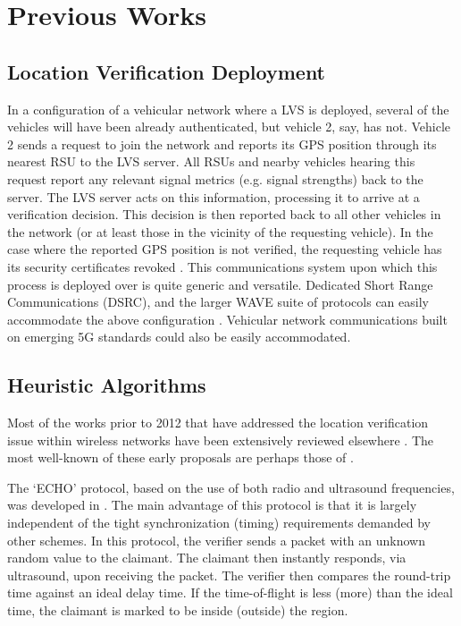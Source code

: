 \documentclass[journal]{IEEEtran}
\begin{document}
\section{Previous Works}

\subsection{Location Verification Deployment}
In a configuration of a vehicular network where a LVS is deployed, several of the vehicles will have been already authenticated, but vehicle 2, say, has not. Vehicle 2 sends a request to join the network and reports its GPS position through its nearest RSU to the LVS server. All RSUs and nearby vehicles hearing this request report any relevant signal metrics (e.g. signal strengths) back to the server.  The LVS server acts on this information, processing it to arrive at a verification decision. This decision is then reported back to all other vehicles in the network (or at least those in the vicinity of the requesting vehicle). In the case where the reported GPS position is not verified, the requesting vehicle has its security certificates revoked \cite{meneguetteintelligent}.
This communications system upon which this process is deployed over is quite generic and versatile. Dedicated Short Range Communications (DSRC), and the larger WAVE suite of protocols can easily accommodate the above configuration \cite{meneguetteintelligent}.
Vehicular network communications built on emerging 5G standards could also be easily accommodated.

\subsection{Heuristic Algorithms}
Most of the works prior to 2012 that have addressed the location verification issue within wireless networks have been extensively reviewed elsewhere \cite{yan2013location}. The most well-known of these early proposals are perhaps those of \cite{sastry2003secure,capkun2006secure,leinmuller2006position,harsch2007secure,rasmussen2008secure,yan2008providing}.

The `ECHO' protocol, based on the use of both radio and ultrasound frequencies, was developed in \cite{sastry2003secure}. The main advantage of this protocol is that it is largely independent of the tight synchronization (timing) requirements demanded by other schemes. In this protocol, the verifier sends a packet with an unknown random value to the claimant. The claimant then instantly responds, via ultrasound, upon receiving the packet. The verifier then compares the round-trip time against an ideal delay time. If the time-of-flight is less (more) than the ideal time, the claimant is marked to be inside (outside) the region.
\end{document}
